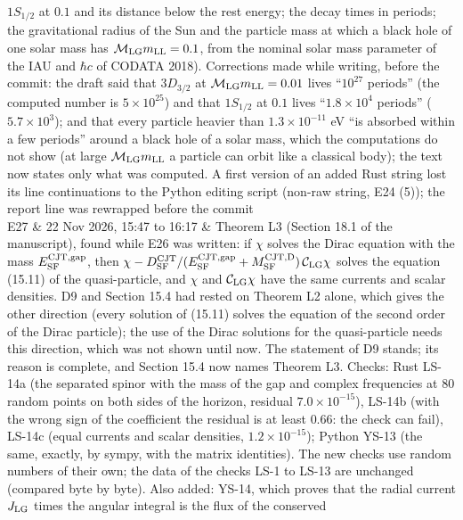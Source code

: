 \documentclass[
  10pt,
]{article}
\begin{document}
\begin{longtable}[]
\(1S_{1/2}\) at \(0.1\) and its distance below the rest energy; the
decay times in periods; the gravitational radius of the Sun and the
particle mass at which a black hole of one solar mass has
\(\mathcal M_{\rm LG}m_{\rm LL}=0.1\), from the nominal solar mass
parameter of the IAU and \(\hbar c\) of CODATA 2018). Corrections made
while writing, before the commit: the draft said that \(3D_{3/2}\) at
\(\mathcal M_{\rm LG}m_{\rm LL}=0.01\) lives ``\(10^{27}\) periods''
(the computed number is \(5\times10^{25}\)) and that \(1S_{1/2}\) at
\(0.1\) lives ``\(1.8\times10^4\) periods'' (\(5.7\times10^{3}\)); and
that every particle heavier than \(1.3\times10^{-11}\) eV ``is absorbed
within a few periods'' around a black hole of a solar mass, which the
computations do not show (at large \(\mathcal M_{\rm LG}m_{\rm LL}\) a
particle can orbit like a classical body); the text now states only what
was computed. A first version of an added Rust string lost its line
continuations to the Python editing script (non-raw string, E24 (5));
the report line was rewrapped before the commit \\
E27 & 22 Nov 2026, 15:47 to 16:17 & Theorem L3 (Section 18.1 of the
manuscript), found while E26 was written: if \(\chi\) solves the Dirac
equation with the mass \(E^{\rm CJT,gap}_{\rm SF}\), then
\(\chi-D^{\rm CJT}_{\rm SF}/(E^{\rm CJT,gap}_{\rm SF}+M^{\rm CJT,D}_{\rm SF})\,\mathcal C_{\rm LG}\chi\)
solves the equation (15.11) of the quasi-particle, and \(\chi\) and
\(\mathcal C_{\rm LG}\chi\) have the same currents and scalar densities.
D9 and Section 15.4 had rested on Theorem L2 alone, which gives the
other direction (every solution of (15.11) solves the equation of the
second order of the Dirac particle); the use of the Dirac solutions for
the quasi-particle needs this direction, which was not shown until now.
The statement of D9 stands; its reason is complete, and Section 15.4 now
names Theorem L3. Checks: Rust LS-14a (the separated spinor with the
mass of the gap and complex frequencies at 80 random points on both
sides of the horizon, residual \(7.0\times10^{-15}\)), LS-14b (with the
wrong sign of the coefficient the residual is at least \(0.66\): the
check can fail), LS-14c (equal currents and scalar densities,
\(1.2\times10^{-15}\)); Python YS-13 (the same, exactly, by sympy, with
the matrix identities). The new checks use random numbers of their own;
the data of the checks LS-1 to LS-13 are unchanged (compared byte by
byte). Also added: YS-14, which proves that the radial current
\(J_{\rm LG}\) times the angular integral is the flux of the conserved

\end{longtable}
\end{document}
